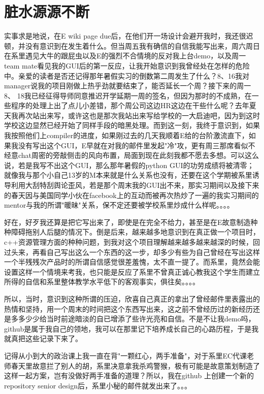 \documentclass[12pt]{book}
\begin{document}
\chapter{脏水源源不断}
\label{sec-26}
实事求是地说，在E wiki page due后，在他们开一场设计会避开我时，我还很迟顿，并没有意识到在发生着什么。但当周五我有确信的自信我能写出来，周六周日在系里遇见大牛的跟屁虫以及E的强烈不合情境的反对我上台demo，以及周一team mate看见我的GUI后的第一反应，让我开始意识到我曾经处在怎样的危险中。亲爱的读者是否还记得那年暑假实习的倒数第二周发生了什么？8、16我对manager说我的项目刚做上热乎劲就要结束了，能否延长一个周？接下来的周一8、 18我已经征得导师同意推迟开学延期一周的签名，但因为那时的不成熟，在一些程序的处理上出了点儿小差错，那个周公司这边HR这边在干些什么呢？去年夏天我再次站出来写，或许这也是那次我站出来写给学校的一大启迪吧，因为到这时学校这边显然已经开始了同样手段的暗黑处理。而到这一刻，我终于意识到，如果我按照他们上compiler的进度，如果刚过去的几天我顺着E给的台阶激流直下，如果我没有写出这个GUI，E早就在对我的邮件里发起"冷"攻，更有周三那席看似不经意chat周密的旁敲侧击的风向布置，局面到现在此刻我都不愿去多想。可以这么说，若是我写不出这个GUI，那么那年暑假的python GUI的功劳成绩将被清零； 就像我与那个小自己13岁的M本来就是什么关系也没有，还要在这个学期被系里诱导利用大刮特刮舆论歪风，若是那个周末我的GUI出不来，那实习期间以及接下来的春天因与美国同学小伙在facebook上的互动而被再次热炒了一遍的我实习期间的mentor与我的所谓"暖昧"关系，保不定还要被学校系里炒成什么样呢。。。。

好在，好歹我还算是把它写出来了，即使是在完全不给力，甚至是在E故意制造种种障碍拖别人后腿的情况下。倒是后来，越来越多地意识到在真正做一个项目时，c++资源管理方面的种种问题，到我对这个项目理解越来越多越来越深的时候，回过头来，再看自己写出这么一个东西的这一步，却多少有些为自己曾经在写出这样一个半残残次产品时的所谓自信感觉很差羞愧，太不直一提了。而系里，竟然会能设置这样一个情境来考我，也只能是反应了系里不曾真正诚心教我这个学生而建立所得的自信和系里整体教学水平低下的客观事实，俱往矣。。。。

所以，当时，意识到这种所谓的压迫，欣喜自己真正的拿出了曾经邮件里表露出的热情和坚持，用一个周末的时间把这个东西写出来，这之前不曾经历过的新经历还是多多少少给当时前途暗淡的自已增添了些许光亮和自信。不是不让我demo吗，github是属于我自己的领地，我可以在那里记下培养成长自己的心路历程，于是我就真把这些记录下来了。

记得从小到大的政治课上我一直在背"一颗红心，两手准备"，对于系里EC代课老师春天里故意拦了别人的胡，系里决意拿我杀鸡警猴，极有可能是故意策划制造了这样一起方案，岂有没做好两手准备的道理？所以，我在github 上创建一个新的repository senior design后，系里小秘的邮件就发出来了。。。
\end{document}
